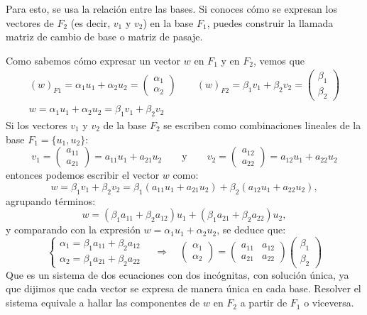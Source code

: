 Para esto, se usa la relación entre las bases. Si conoces cómo se expresan los vectores de \(F_2\) (es decir, \(v_1\) y \(v_2\)) en la base \(F_1\), puedes construir la llamada matriz de cambio de base o matriz de pasaje.

Como sabemos cómo expresar un vector \(w\) en \(F_1\) y en \(F_2\), vemos que
\begin{gather*}
  (w)_{F1} = \alpha_1 u_1 + \alpha_2 u_2 = \begin{pmatrix}
    \alpha_1 \\ \alpha_2
  \end{pmatrix} \qquad (w)_{F2} = \beta_1 v_1 + \beta_2 v_2 = \begin{pmatrix}
    \beta_1 \\ \beta_2
  \end{pmatrix} \\[5pt]
  w = \alpha_1 u_1 + \alpha_2 u_2 = \beta_1 v_1 + \beta_2 v_2
\end{gather*}
Si los vectores \(v_1\) y \(v_2\) de la base \(F_2\) se escriben como combinaciones lineales de la base \(F_1 = \{u_1, u_2\}\):
\[
  v_1 = \begin{pmatrix}
    a_{11} \\ a_{21}
  \end{pmatrix} = a_{11} u_1 + a_{21} u_2 \qquad \text{y} \qquad v_2 = \begin{pmatrix}
    a_{12} \\ a_{22}
  \end{pmatrix} = a_{12} u_1 + a_{22} u_2
\]
entonces podemos escribir el vector \(w\) como:
\[
w = \beta_1 v_1 + \beta_2 v_2 = \beta_1(a_{11}u_1 + a_{21}u_2) + \beta_2(a_{12}u_1 + a_{22}u_2),
\]
agrupando términos:
\[
w = (\beta_1 a_{11} + \beta_2 a_{12}) u_1 + (\beta_1 a_{21} + \beta_2 a_{22}) u_2,
\]
y comparando con la expresión \(w = \alpha_1 u_1 + \alpha_2 u_2\), se deduce que:
\[
\begin{cases}
\alpha_1 = \beta_1 a_{11} + \beta_2 a_{12} \\
\alpha_2 = \beta_1 a_{21} + \beta_2 a_{22}
\end{cases}
\quad\Longrightarrow\quad
\begin{pmatrix}
\alpha_1 \\
\alpha_2
\end{pmatrix}
=
\begin{pmatrix}
a_{11} & a_{12} \\
a_{21} & a_{22}
\end{pmatrix}
\begin{pmatrix}
\beta_1 \\
\beta_2
\end{pmatrix}
\]
Que es un sistema de dos ecuaciones con dos incógnitas, con solución única, ya que dijimos que cada vector se expresa de manera única en cada base. Resolver el sistema equivale a hallar las componentes de \(w\) en \(F_2\) a partir de \(F_1\) o viceversa.

